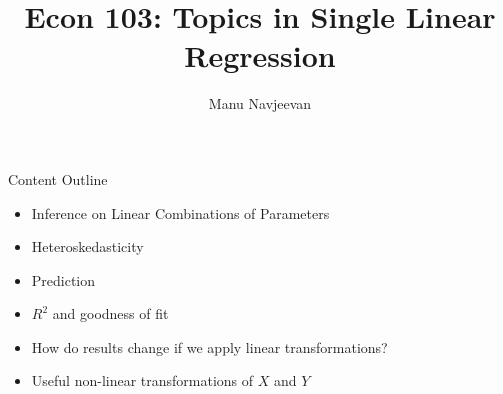 \documentclass[notheorems, 9pt, handout]{beamer}
\title{Econ 103: Topics in Single Linear Regression}
\author{Manu Navjeevan}
\institute{UCLA}
\begin{document}
\frame{\titlepage}


\begin{frame}{Content Outline} 
	\label{frame:content-outline}
	\begin{itemize}
		\item Inference on Linear Combinations of Parameters
		\item Heteroskedasticity
	\end{itemize}
	\begin{itemize}
		\item Prediction
		\item \(R^2\) and goodness of fit
	\end{itemize}
	\begin{itemize}
		\item How do results change if we apply linear transformations?
		\item Useful non-linear transformations of \(X\) and \(Y\)
	\end{itemize}
\end{frame}
\end{document}
